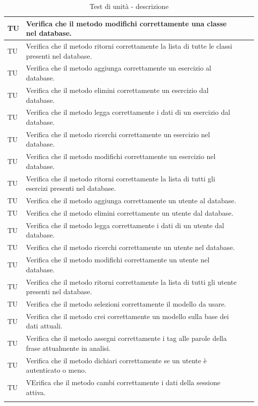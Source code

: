 \begin{longtable}{|>{\centering\arraybackslash}m{1.6cm}|>{\centering\arraybackslash}m{6.41cm}|>{\centering\arraybackslash}m{3.1cm}| c |}
		TU & Verifica che il metodo modifichi correttamente una classe nel database. \\ \hline
		TU & Verifica che il metodo ritorni correttamente la lista di tutte le classi presenti nel database.  \\ \hline	
		TU & Verifica che il metodo aggiunga correttamente un esercizio al database. \\ \hline
		TU & Verifica che il metodo elimini correttamente un esercizio dal database. \\ \hline
		TU & Verifica che il metodo legga correttamente i dati di un esercizio dal database. \\ \hline
		TU & Verifica che il metodo ricerchi correttamente un esercizio nel database. \\ \hline
		TU & Verifica che il metodo modifichi correttamente un esercizio nel database. \\ \hline
		TU & Verifica che il metodo ritorni correttamente la lista di tutti gli esercizi presenti nel database.  \\ \hline	
		TU & Verifica che il metodo aggiunga correttamente un utente al database. \\ \hline
		TU & Verifica che il metodo elimini correttamente un utente dal database. \\ \hline
		TU & Verifica che il metodo legga correttamente i dati di un utente dal database. \\ \hline
		TU & Verifica che il metodo ricerchi correttamente un utente nel database. \\ \hline
		TU & Verifica che il metodo modifichi correttamente un utente nel database. \\ \hline
		TU & Verifica che il metodo ritorni correttamente la lista di tutti gli utente presenti nel database.  \\ \hline
		TU & Verifica che il metodo selezioni correttamente il modello da usare.  \\ \hline
		TU & Verifica che il metodo crei correttamente un modello sulla base dei dati attuali.  \\ \hline
		TU & Verifica che il metodo assegni correttamente i tag alle parole della frase attualmente in analisi.  \\ \hline
		TU & Verifica che il metodo dichiari correttamente se un utente è autenticato o meno.  \\ \hline
		TU & VErifica che il metodo cambi correttamente i dati della sessione attiva.  \\ \hline
		\caption{Test di unità - descrizione}
\end{longtable}

